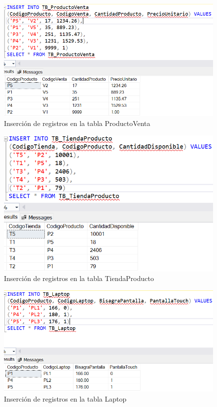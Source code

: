 \begin{figure}[H]
  \centering
  \includegraphics[scale = 0.5]{Imagenes/sql/3.insertar_registros/insertar_registros_productoventa.png}
  \caption{Inserción de registros en la tabla ProductoVenta}
\end{figure}

\begin{figure}[H]
  \centering
  \includegraphics[scale = 0.5]{Imagenes/sql/3.insertar_registros/insertar_registros_tiendaproducto.png}
  \caption{Inserción de registros en la tabla TiendaProducto}
\end{figure}

\begin{figure}[H]
  \centering
  \includegraphics[scale = 0.5]{Imagenes/sql/3.insertar_registros/insertar_registros_Laptop.png}
  \caption{Inserción de registros en la tabla Laptop}
\end{figure}

